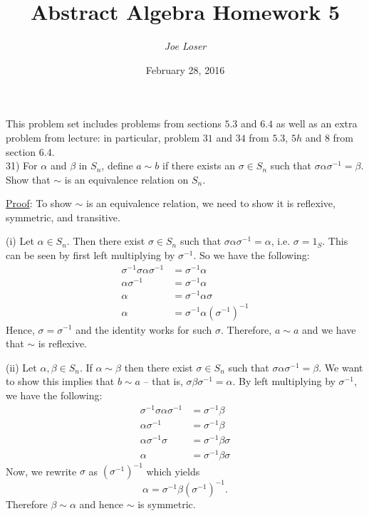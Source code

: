 \documentclass{article}
\title{Abstract Algebra Homework 5}
\author{\textit{Joe Loser}}
\date{February 28, 2016}
\begin{document}
\maketitle

This problem set includes problems from sections $5.3$ and $6.4$ as well as an extra problem from lecture: in particular, problem $31$ and $34$ from $5.3$, $5h$ and $8$ from section $6.4$. \\

31) For $\alpha$ and $\beta$ in $S_n$, define $a \sim b$ if there exists an $\sigma \in S_n$ such that $\sigma \alpha \sigma^{-1} = \beta$. Show that $\sim$ is an equivalence relation on $S_n$.

\underline{Proof}: To show $\sim$ is an equivalence relation, we need to show it is reflexive, symmetric, and transitive. 

(i) Let $\alpha \in S_n$. Then there exist $\sigma \in S_n$ such that $\sigma \alpha \sigma^{-1} = \alpha$, i.e. $\sigma = 1_S$. This can be seen by first left multiplying by $\sigma^{-1}$. So we have the following:
\begin{align*}
	\sigma^{-1} \sigma \alpha \sigma^{-1} &= \sigma^{-1} \alpha \\
	\alpha \sigma^{-1} &= \sigma^{-1} \alpha \\
	\alpha &= \sigma^{-1} \alpha \sigma \\
	\alpha &= \sigma^{-1} \alpha (\sigma^{-1})^{-1}
\end{align*}
Hence, $\sigma = \sigma^{-1}$ and the identity works for such $\sigma$. Therefore, $a \sim a$ and we have that $\sim$ is reflexive.

(ii) Let $\alpha, \beta \in S_n$. If $\alpha \sim \beta$ then there exist $\sigma \in S_n$ such that $\sigma \alpha \sigma^{-1} = \beta$. We want to show this implies that $b \sim a$ -- that is, $\sigma \beta \sigma^{-1} = \alpha$. By left multiplying by $\sigma^{-1}$, we have the following:
\begin{align*}
	\sigma^{-1}  \sigma \alpha \sigma^{-1} &= \sigma^{-1} \beta \\
	\alpha \sigma^{-1} &= \sigma^{-1} \beta \\
	\alpha \sigma^{-1} \sigma &= \sigma^{-1} \beta \sigma \\
	\alpha &= \sigma^{-1} \beta \sigma
\end{align*}
Now, we rewrite $\sigma$ as $(\sigma^{-1})^{-1}$ which yields
$$\alpha = \sigma^{-1} \beta (\sigma^{-1})^{-1}.$$ 
Therefore $\beta \sim \alpha$ and hence $\sim$ is symmetric.
\end{document}
